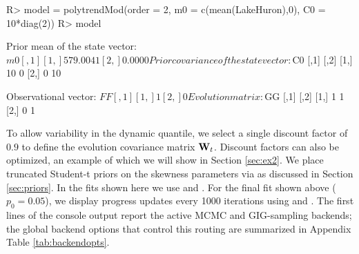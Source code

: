 \documentclass[jss]{jss}
\begin{document}
\begin{CodeChunk}
\begin{CodeInput}
R> model = polytrendMod(order = 2, m0 = c(mean(LakeHuron),0), C0 = 10*diag(2))
R> model
\end{CodeInput}
\begin{CodeOutput}
Prior mean of the state vector:
$m0
         [,1]
[1,] 579.0041
[2,]   0.0000


Prior covariance of the state vector:
$C0
     [,1] [,2]
[1,]   10    0
[2,]    0   10


Observational vector:
$FF
     [,1]
[1,]    1
[2,]    0


Evolution matrix:
$GG
     [,1] [,2]
[1,]    1    1
[2,]    0    1
\end{CodeOutput}
\end{CodeChunk}

To allow variability in the dynamic quantile, we select a single discount factor of $0.9$ to define the evolution covariance matrix ${\bf W}_t$. Discount factors can also be optimized, an example of which we will show in Section \ref{sec:ex2}. We place truncated Student-t priors on the skewness parameters via  as discussed in Section \ref{sec:priors}. In the fits shown here we use  and . For the final fit shown above (\(p_0=0.05\)), we display  progress updates every 1000 iterations using  and . The first lines of the console output report the active MCMC and GIG-sampling backends; the global backend options that control this routing are summarized in Appendix Table \ref{tab:backendopts}.
\end{document}
